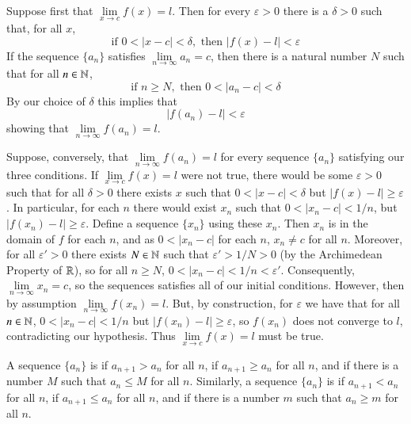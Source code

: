 \documentclass[12pt]{report}
\begin{document}
\begin{proof*}{}{}
    Suppose first that $\lim\limits_{x\rightarrow c}f(x) = l$. Then for every $\varepsilon > 0$ there is a $\delta > 0$ such that, for all $x$, \begin{equation*}
        \text{if } 0 < |x-c| < \delta, \text{ then } |f(x) - l| < \varepsilon
    \end{equation*}
    If the sequence $\{a_n\}$ satisfies $\lim\limits_{n\rightarrow \infty}a_n = c$, then there is a natural number $N$ such that for all $n \in \mathbb N$, \begin{equation*}
        \text{if } n \geq N, \text{ then } 0 < |a_n - c| < \delta
    \end{equation*}
    By our choice of $\delta$ this implies that \begin{equation*}
        |f(a_n) - l| <\varepsilon
    \end{equation*}
    showing that $\lim\limits_{n\rightarrow \infty} f(a_n) = l$.


    Suppose, conversely, that $\lim\limits_{n\rightarrow \infty}f(a_n) = l$ for every sequence $\{a_n\}$ satisfying our three conditions. If $\lim\limits_{x\rightarrow c}f(x) = l$ were not true, there would be some $\varepsilon > 0$ such that for all $\delta > 0$ there exists $x$ such that $0 < |x-c| < \delta$ but $|f(x) - l| \geq \varepsilon$. In particular, for each $n$ there would exist $x_n$ such that $0<|x_n - c| < 1/n$, but $|f(x_n) - l| \geq \varepsilon$. Define a sequence $\{x_n\}$ using these $x_n$. Then $x_n$ is in the domain of $f$ for each $n$, and as $0 < |x_n-c|$ for each $n$, $x_n \neq c$ for all $n$. Moreover, for all $\varepsilon' > 0$ there exists $N \in \mathbb N$ such that $\varepsilon' > 1/N > 0$ (by the Archimedean Property of $\mathbb R$), so for all $n \geq N$, $0 < |x_n - c| < 1/n < \varepsilon'$. Consequently, $\lim\limits_{n\rightarrow \infty}x_n = c$, so the sequences satisfies all of our initial conditions. However, then by assumption $\lim\limits_{n\rightarrow \infty}f(x_n) = l$. But, by construction, for $\varepsilon$ we have that for all $n \in \mathbb N$, $0 < |x_n - c| < 1/n$ but $|f(x_n) - l| \geq \varepsilon$, so $f(x_n)$ does not converge to $l$, contradicting our hypothesis. Thus $\lim\limits_{x\rightarrow c}f(x) = l$ must be true.
\end{proof*}


\begin{defn}{}{}
    A sequence $\{a_n\}$ is  if $a_{n+1} > a_n$ for all $n$,  if $a_{n+1} \geq a_n$ for all $n$, and  if there is a number $M$ such that $a_n \leq M$ for all $n$. Similarly, a sequence $\{a_n\}$ is  if $a_{n+1} < a_n$ for all $n$,  if $a_{n+1} \leq a_n$ for all $n$, and  if there is a number $m$ such that $a_n \geq m$ for all $n$.
\end{defn}
\end{document}
